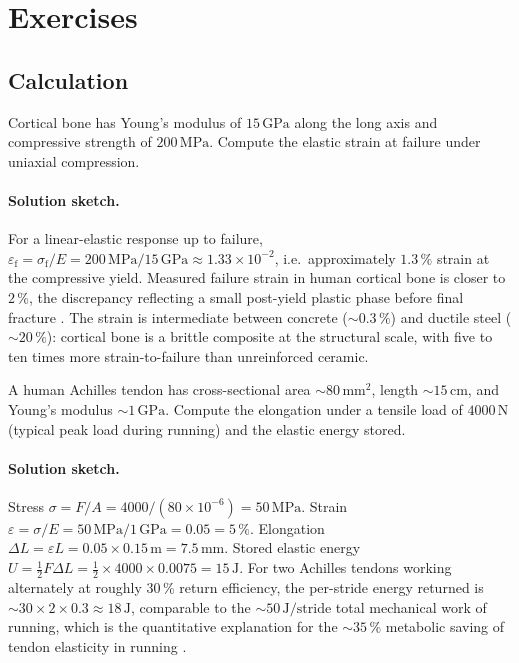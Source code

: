 \section{Exercises}

\subsection*{Calculation}

\begin{exercise}
Cortical bone has Young's modulus of $15\,\text{GPa}$ along the long
axis and compressive strength of $200\,\text{MPa}$. Compute the
elastic strain at failure under uniaxial compression.
\end{exercise}

\paragraph{Solution sketch.}
For a linear-elastic response up to failure,
$\varepsilon_{\text{f}} = \sigma_{\text{f}}/E = 200\,\text{MPa}/15\,\text{GPa}
\approx 1.33 \times 10^{-2}$, i.e.\ approximately $1.3\,\%$ strain at
the compressive yield. Measured failure strain in human cortical
bone is closer to $2\,\%$, the discrepancy reflecting a small
post-yield plastic phase before final fracture
\cite[Tab.~3]{paper:v6c06-reilly-burstein-1975}. The strain is
intermediate between concrete ($\sim 0.3\,\%$) and ductile steel
($\sim 20\,\%$): cortical bone is a brittle composite at the
structural scale, with five to ten times more strain-to-failure
than unreinforced ceramic.

\begin{exercise}
A human Achilles tendon has cross-sectional area $\sim 80\,\text{mm}^2$,
length $\sim 15\,\text{cm}$, and Young's modulus $\sim 1\,\text{GPa}$.
Compute the elongation under a tensile load of $4000\,\text{N}$
(typical peak load during running) and the elastic energy stored.
\end{exercise}

\paragraph{Solution sketch.}
Stress $\sigma = F/A = 4000/(80 \times 10^{-6}) = 50\,\text{MPa}$.
Strain $\varepsilon = \sigma/E = 50\,\text{MPa}/1\,\text{GPa} = 0.05
= 5\,\%$. Elongation $\Delta L = \varepsilon L = 0.05 \times
0.15\,\text{m} = 7.5\,\text{mm}$. Stored elastic energy
$U = \tfrac{1}{2} F \Delta L = \tfrac{1}{2} \times 4000 \times 0.0075
= 15\,\text{J}$. For two Achilles tendons working alternately at
roughly $30\,\%$ return efficiency, the per-stride energy returned is
$\sim 30 \times 2 \times 0.3 \approx 18\,\text{J}$, comparable to the
$\sim 50\,\text{J}/\text{stride}$ total mechanical work of running,
which is the quantitative explanation for the $\sim 35\,\%$ metabolic
saving of tendon elasticity in running
\cite[p.~64]{paper:v6c06-alexander-1991}.

